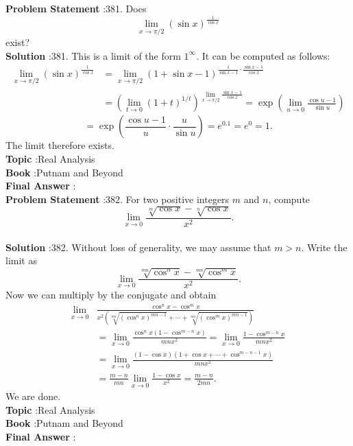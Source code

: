 \documentclass[10pt]{article}
\begin{document}
\textbf{Problem Statement} :381. Does$$ \lim _{x \rightarrow \pi / 2}(\sin x)^{\frac{1}{\cos x}} $$exist?\\
\textbf{Solution} :381. This is a limit of the form $1^{\infty}$. It can be computed as follows:$$ \begin{aligned} \lim _{x \rightarrow \pi / 2}(\sin x)^{\frac{1}{\cos x}} &=\lim _{x \rightarrow \pi / 2}(1+\sin x-1)^{\frac{1}{\sin x-1} \cdot \frac{\sin x-1}{\cos x}} \\ &=\left(\lim _{t \rightarrow 0}(1+t)^{1 / t}\right)^{\lim _{x \rightarrow \pi / 2} \frac{\sin x-1}{\cos x}}=\exp \left(\lim _{u \rightarrow 0} \frac{\cos u-1}{\sin u}\right) \end{aligned} $$$$ =\exp \left(\frac{\cos u-1}{u} \cdot \frac{u}{\sin u}\right)=e^{0.1}=e^{0}=1 . $$The limit therefore exists.\\
\textbf{Topic} :Real Analysis\\
\textbf{Book} :Putnam and Beyond\\
\textbf{Final Answer} :\\


\textbf{Problem Statement} :382. For two positive integers $m$ and $n$, compute$$ \lim _{x \rightarrow 0} \frac{\sqrt[m]{\cos x}-\sqrt[n]{\cos x}}{x^{2}} . $$\\
\textbf{Solution} :382. Without loss of generality, we may assume that $m>n$. Write the limit as$$ \lim _{x \rightarrow 0} \frac{\sqrt[m n]{\cos ^{n} x}-\sqrt[m n]{\cos ^{m} x}}{x^{2}} . $$Now we can multiply by the conjugate and obtain$$ \begin{aligned} \lim _{x \rightarrow 0} & \frac{\cos ^{n} x-\cos ^{m} x}{x^{2}\left(\sqrt[m n]{\left(\cos ^{n} x\right)^{m n-1}}+\cdots+\sqrt[m n]{\left(\cos ^{m} x\right)^{m n-1}}\right)} \\ &=\lim _{x \rightarrow 0} \frac{\cos ^{n} x\left(1-\cos ^{m-n} x\right)}{m n x^{2}}=\lim _{x \rightarrow 0} \frac{1-\cos ^{m-n} x}{m n x^{2}} \\ &=\lim _{x \rightarrow 0} \frac{(1-\cos x)\left(1+\cos x+\cdots+\cos ^{m-n-1} x\right)}{m n x^{2}} \\ &=\frac{m-n}{m n} \lim _{x \rightarrow 0} \frac{1-\cos x}{x^{2}}=\frac{m-n}{2 m n} . \end{aligned} $$We are done.\\
\textbf{Topic} :Real Analysis\\
\textbf{Book} :Putnam and Beyond\\
\textbf{Final Answer} :\\
\end{document}
